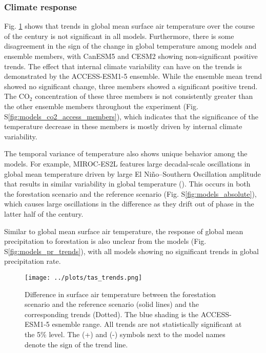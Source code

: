 \documentclass[]{article}
\begin{document}
\subsubsection{Climate response}

Fig. \ref{fig:models_tas_trends} shows that trends in global mean surface air temperature over the course of the century is not significant in all models.
Furthermore, there is some disagreement in the sign of the change in global temperature among models and ensemble members, with CanESM5 and CESM2 showing non-significant positive trends.
The effect that internal climate variability can have on the trends is demonstrated by the ACCESS-ESM1-5 ensemble.
While the ensemble mean trend showed no significant change, three members showed a significant positive trend.
The CO$_2$ concentration of these three members is not consistently greater than the other ensemble members throughout the experiment (Fig. S\ref{fig:models_co2_access_members}), which indicates that the significance of the temperature decrease in these members is mostly driven by internal climate variability.

The temporal variance of temperature also shows unique behavior among the models.
For example, MIROC-ES2L features large decadal-scale oscillations in global mean temperature driven by large El Niño–Southern Oscillation amplitude that results in similar variability in global temperature (\cite{hajima_development_2020}).
This occurs in both the forestation scenario and the reference scenario (Fig. S\ref{fig:models_absolute}), which causes large oscillations in the difference as they drift out of phase in the latter half of the century.

Similar to global mean surface air temperature, the response of global mean precipitation to forestation is also unclear from the models (Fig. S\ref{fig:models_pr_trends}), with all models showing no significant trends in global precipitation rate.

\begin{figure}[H]
    \centering
    \texttt{[image: ../plots/tas\_trends.png]}
    \caption{Difference in surface air temperature between the forestation scenario and the reference scenario (solid lines) and the corresponding trends (Dotted). The blue shading is the ACCESS-ESM1-5 esnemble range. All trends are not statistically significant at the 5\% level. The (+) and (-) symbols next to the model names denote the sign of the trend line.}
    \label{fig:models_tas_trends}
\end{figure}
\end{document}
